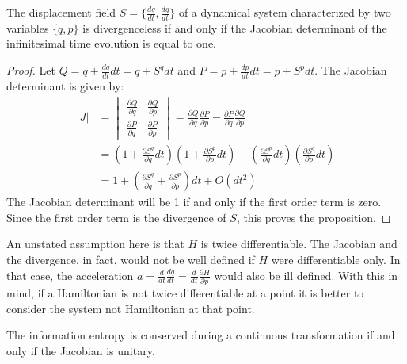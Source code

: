 \documentclass[10pt,twocolumn, nofootinbib]{revtex4-2}
\begin{document}
\begin{prop}
	The displacement field $S=\{\frac{dq}{dt}, \frac{dq}{dt} \}$ of a dynamical system characterized by two variables $\{q, p\}$ is divergenceless if and only if the Jacobian determinant of the infinitesimal time evolution is equal to one.
\end{prop}

\begin{proof}
	Let $Q = q + \frac{dq}{dt} dt = q + S^q dt$ and $P = p + \frac{dp}{dt} dt = p + S^p dt$. The Jacobian determinant is given by:
	\begin{align*}
		|J| &= \begin{vmatrix}
			\frac{\partial Q}{\partial q} & \frac{\partial Q}{\partial p} \\
			\frac{\partial P}{\partial q} & \frac{\partial P}{\partial  p} 
		\end{vmatrix} = \frac{\partial Q}{\partial q} \frac{\partial P}{\partial  p} - \frac{\partial P}{\partial q} \frac{\partial Q}{\partial p} \\
		&= \left(1 + \frac{\partial S^q}{\partial  q}dt\right)\left(1 + \frac{\partial S^p}{\partial  p}dt\right) - \left(\frac{\partial S^p}{\partial  q}dt\right)\left(\frac{\partial S^q}{\partial  p}dt\right) \\
		&= 1 + \left(\frac{\partial S^q}{\partial  q} + \frac{\partial S^p}{\partial  p}\right)dt + O(dt^2)
	\end{align*}
	The Jacobian determinant will be 1 if and only if the first order term is zero. Since the first order term is the divergence of $S$, this proves the proposition.	
\end{proof}

\begin{remark}
	An unstated assumption here is that $H$ is twice differentiable. The Jacobian and the divergence, in fact, would not be well defined if $H$ were differentiable only. In that case, the acceleration $a = \frac{d}{dt}\frac{dq}{dt} = \frac{d}{dt} \frac{\partial H}{\partial p}$ would also be ill defined. With this in mind, if a Hamiltonian is not twice differentiable at a point it is better to consider the system not Hamiltonian at that point.
\end{remark}

\begin{prop}
	The information entropy is conserved during a continuous transformation if and only if the Jacobian is unitary.
\end{prop}
\end{document}
